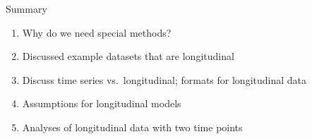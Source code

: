 \documentclass[
  9pt,
  ignorenonframetext,
]{beamer}
\begin{document}
\begin{frame}{Summary}
\protect\hypertarget{summary}{}
\begin{enumerate}
\item
  Why do we need special methods?
\item
  Discussed example datasets that are longitudinal
\item
  Discuss time series vs.~longitudinal; formats for longitudinal data
\item
  Assumptions for longitudinal models
\item
  Analyses of longitudinal data with two time points
\end{enumerate}
\end{frame}
\end{document}

